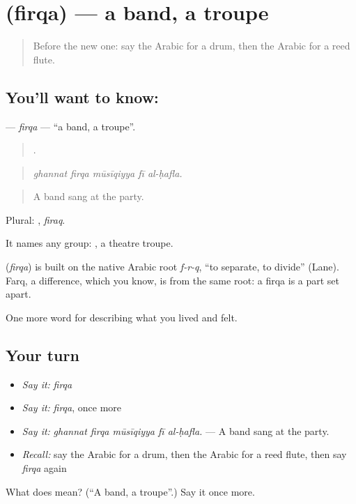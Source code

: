 \section[\texorpdfstring{\ar{فرقة} (firqa)}{فرقة (firqa)}]{ (firqa) — a band, a troupe}

\label{lesson:AR-C544-firqa}



\begin{quote}
Before the new one: say the Arabic for a drum, then the Arabic for a reed flute.
\end{quote}

\subsection*{You'll want to know: }
\textbf{} — \emph{firqa} — \textquotedblleft{}a band, a troupe\textquotedblright{}.

\begin{quote}
    .
\end{quote}

\begin{quote}
\emph{ghannat firqa mūsīqiyya fī al-ḥafla.}
\end{quote}

\begin{quote}
A band sang at the party.
\end{quote}

Plural: , \emph{firaq}.

It names any group:  , a theatre troupe.

\begin{cousinweb}
\textbf{} (\emph{firqa}) is built on the native Arabic root \emph{f-r-q}, \textquotedblleft{}to separate, to divide\textquotedblright{} (Lane). Farq, a difference, which you know, is from the same root: a firqa is a part set apart.
\end{cousinweb}

\begin{grammarlens}[title={What you've built}]
One more word for describing what you lived and felt.
\end{grammarlens}

\subsection*{Your turn}
\begin{itemize}
\raggedright
  \item \emph{Say it:} \emph{firqa}
  \item \emph{Say it:} \emph{firqa}, once more
  \item \emph{Say it:} \emph{ghannat firqa mūsīqiyya fī al-ḥafla.} — A band sang at the party.
  \item \emph{Recall:} say the Arabic for a drum, then the Arabic for a reed flute, then say \emph{firqa} again
\end{itemize}

\begin{tcolorbox}[breakable,colback=teal!4,colframe=teal!35!black,title={Before you move on}]
What does  mean? (\textquotedblleft{}A band, a troupe\textquotedblright{}.) Say it once more.
\end{tcolorbox}
